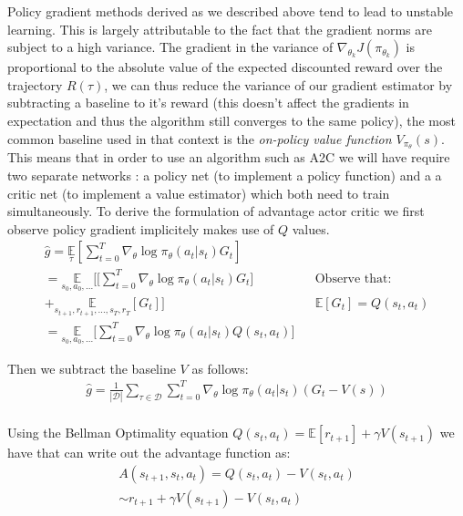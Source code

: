 Policy gradient methods derived as we described above tend to lead to unstable learning. 
This is largely attributable to the fact that the gradient norms are subject to a high variance.
The gradient in the variance of $\nabla_{\theta_k} J(\pi_{\theta_k})$ is proportional to the absolute value of the expected discounted reward over the trajectory $R(\tau)$, we can thus reduce the variance of our gradient estimator by subtracting a baseline to it's reward (this doesn't affect the gradients in expectation and thus the algorithm still converges to the same policy), the most common baseline used in that context is the \textit{on-policy value function $V_{\pi_\theta}(s)$}. 
This means that in order to use an algorithm such as A2C we will have require two separate networks : a policy net (to implement a policy function) and a a critic net (to implement a value estimator) which both need to train simultaneously. To derive the formulation of advantage actor critic we first observe policy gradient implicitely makes use of $Q$ values.\\

\begin{align*}
    \hat{g} = \underset{\tau}{\mathbb{E}} \left[ \sum_{t=0}^{T} \nabla_\theta \log \pi_\theta (a_t|s_t) G_t \right] && \text{}\\
    = \underset{s_0,a_0,...}{\mathbb{E}} \bigg[ \big[ \sum_{t=0}^{T} \nabla_\theta \log \pi_\theta (a_t|s_t) G_t \big] && \text{Observe that:}\\
    + \underset{s_{t+1},r_{t+1},...,s_{T},r_{T}}{\mathbb{E}} [G_t] \bigg] && \mathbb{E} [G_t] = Q(s_t,a_t)\\
    = \underset{s_0,a_0,...}{\mathbb{E}} \bigg[ \sum_{t=0}^{T} \nabla_\theta \log \pi_\theta (a_t|s_t) Q(s_t,a_t) \bigg] && 
\end{align*}

Then we subtract the baseline $V$ as follows:
\begin{align*}
    \hat{g} = \frac{1}{|\mathcal{D}|} \sum_{\tau \in \mathcal{D}} \sum_{t=0}^{T} \nabla_\theta \log \pi_\theta (a_t|s_t) (G_t-V(s))\\
\end{align*}

Using the Bellman Optimality equation $Q(s_t,a_t) = \mathbb{E}[r_{t+1}] + \gamma V(s_{t+1})$ we have that can write out the advantage function as:
\begin{align*}
    A(s_{t+1},s_t,a_t) = Q(s_t,a_t) - V(s_t,a_t) \\
   \sim r_{t+1} + \gamma V(s_{t+1}) - V(s_t,a_t) 
\end{align*}

